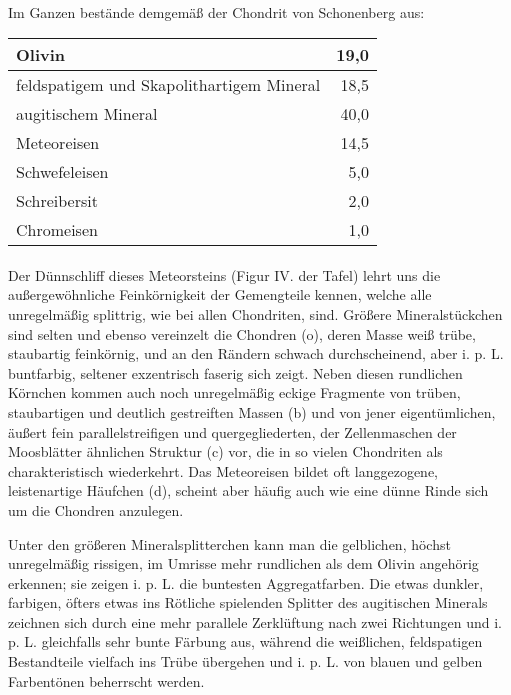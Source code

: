 \documentclass[a4paper, 11pt, oneside]{article}
\begin{document}
\paragraph{}
Im Ganzen bestände demgemäß der Chondrit von Schonenberg aus:
\begin{center}
    \begin{tabular}{ |l|r| } 
    \hline
    Olivin & 19,0\\\hline
    feldspatigem und Skapolithartigem Mineral & 18,5\\\hline
    augitischem Mineral & 40,0\\\hline
    Meteoreisen & 14,5\\\hline
    Schwefeleisen & 5,0\\\hline
    Schreibersit & 2,0\\\hline
    Chromeisen & 1,0\\
    \hline
    \end{tabular}
\end{center}
\paragraph{}
Der Dünnschliff dieses Meteorsteins (Figur IV. der Tafel) lehrt uns die außergewöhnliche Feinkörnigkeit der Gemengteile kennen, welche alle unregelmäßig splittrig, wie bei allen Chondriten, sind. Größere Mineralstückchen sind selten und ebenso vereinzelt die Chondren (o), deren Masse weiß trübe, staubartig feinkörnig, und an den Rändern schwach durchscheinend, aber i. p. L. buntfarbig, seltener exzentrisch faserig sich zeigt. Neben diesen rundlichen Körnchen kommen auch noch unregelmäßig eckige Fragmente von trüben, staubartigen und deutlich gestreiften Massen (b) und von jener eigentümlichen, äußert fein parallelstreifigen und quergegliederten, der Zellenmaschen der Moosblätter ähnlichen Struktur (c) vor, die in so vielen Chondriten als charakteristisch wiederkehrt. Das Meteoreisen bildet oft langgezogene, leistenartige Häufchen (d), scheint aber häufig auch wie eine dünne Rinde sich um die Chondren anzulegen.

Unter den größeren Mineralsplitterchen kann man die gelblichen, höchst unregelmäßig rissigen, im Umrisse mehr rundlichen als dem Olivin angehörig erkennen; sie zeigen i. p. L. die buntesten Aggregatfarben. Die etwas dunkler, farbigen, öfters etwas ins Rötliche spielenden Splitter des augitischen Minerals zeichnen sich durch eine mehr parallele Zerklüftung nach zwei Richtungen und i. p. L. gleichfalls sehr bunte Färbung aus, während die weißlichen, feldspatigen Bestandteile vielfach ins Trübe übergehen und i. p. L. von blauen und gelben Farbentönen beherrscht werden.
\end{document}
